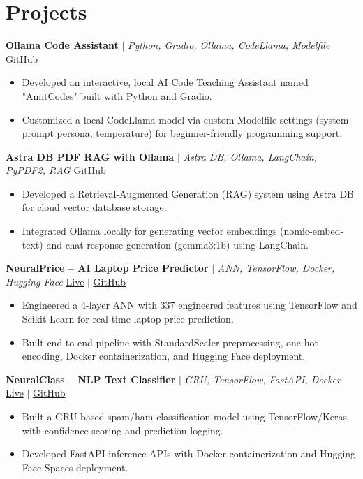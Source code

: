 \documentclass[a4paper,9pt]{article}
\newcommand{\resumeItem}[1]{\item\small #1}
\begin{document}
\vspace{-2mm}

\section{Projects}

\noindent\textbf{Ollama Code Assistant} $|$ \textit{Python, Gradio, Ollama, CodeLlama, Modelfile} \hfill
\href{https://github.com/hsachan295-source/Ollama-Code-Assistant}{\small GitHub}
\begin{itemize}
\resumeItem{Developed an interactive, local AI Code Teaching Assistant named "AmitCodes" built with Python and Gradio.}
\resumeItem{Customized a local CodeLlama model via custom Modelfile settings (system prompt persona, temperature) for beginner-friendly programming support.}
\end{itemize}

\vspace{1pt}
\noindent\textbf{Astra DB PDF RAG with Ollama} $|$ \textit{Astra DB, Ollama, LangChain, PyPDF2, RAG} \hfill
\href{https://github.com/hsachan295-source/astra-db-pdf-rag-ollama}{\small GitHub}
\begin{itemize}
\resumeItem{Developed a Retrieval-Augmented Generation (RAG) system using Astra DB for cloud vector database storage.}
\resumeItem{Integrated Ollama locally for generating vector embeddings (nomic-embed-text) and chat response generation (gemma3:1b) using LangChain.}
\end{itemize}

\vspace{1pt}
\noindent\textbf{NeuralPrice -- AI Laptop Price Predictor} $|$ \textit{ANN, TensorFlow, Docker, Hugging Face} \hfill
\href{https://huggingface.co/spaces/Harsh0809/laptop-price-predictor-Ann}{\small Live} $|$
\href{https://github.com/hsachan295-source/Laptop-Price-Prediction-ANN}{\small GitHub}
\begin{itemize}
\resumeItem{Engineered a 4-layer ANN with 337 engineered features using TensorFlow and Scikit-Learn for real-time laptop price prediction.}
\resumeItem{Built end-to-end pipeline with StandardScaler preprocessing, one-hot encoding, Docker containerization, and Hugging Face deployment.}
\end{itemize}

\vspace{1pt}
\noindent\textbf{NeuralClass -- NLP Text Classifier} $|$ \textit{GRU, TensorFlow, FastAPI, Docker} \hfill
\href{https://huggingface.co/spaces/Harsh0809/gru-text-classifier}{\small Live} $|$
\href{https://github.com/hsachan295-source/Email-Spam-Detector}{\small GitHub}
\begin{itemize}
\resumeItem{Built a GRU-based spam/ham classification model using TensorFlow/Keras with confidence scoring and prediction logging.}
\resumeItem{Developed FastAPI inference APIs with Docker containerization and Hugging Face Spaces deployment.}
\end{itemize}
\end{document}
